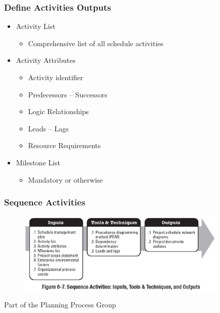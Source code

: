 \begin{frame}
\frametitle{Define Activities \hfill Outputs}
\begin{itemize}
	\item Activity List
		\begin{itemize}
			\item Comprehensive list of all schedule activities
		\end{itemize}
	\item Activity Attributes
		\begin{itemize}
			\item Activity identifier
			\item Predecessors – Successors
			\item Logic Relationships
			\item Leads – Lags
			\item Resource Requirements
		\end{itemize}
	\item Milestone List
		\begin{itemize}
			\item Mandatory or otherwise
		\end{itemize}
\end{itemize}
\end{frame}




\begin{frame}
\frametitle{Sequence Activities}
\begin{figure}
	\centering
		\includegraphics[width = 10cm]{images/Fig6-7.jpg}
	\label{fig:6-7}
\end{figure}
Part of the Planning Process Group
\end{frame}




